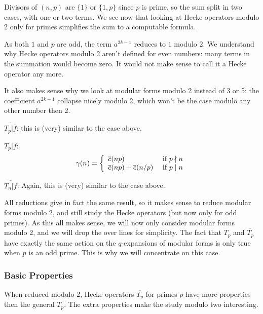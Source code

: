 Divisors of $(n,p)$ are $\{1\}$ or $\{1,p\}$ since $p$ is prime, so the sum split in two cases, with one or two terms.
We see now that looking at Hecke operators modulo 2 only for primes simplifies the sum to a computable formula.

As both $1$ and $p$ are odd, the term $a^{2k-1}$ reduces to $1$ modulo 2.
We understand why Hecke operators modulo 2 aren't defined for even numbers: many terms in the summation would become zero.
It would not make sense to call it a Hecke operator any more.

It also makes sense why we look at modular forms modulo 2 instead of 3 or 5: the coefficient $a^{2k-1}$ collapse nicely modulo 2, which won't be the case modulo any other number then 2.

$\overline{T_p|\overline{f}}$:
this is (very) similar to the case above.

$\overline{T_p}|\overline{f}$:
$$
\gamma(n)
= \left\lbrace
\begin{array}{l l}
  \overline{c}(np)                   & \text{ if } p \nmid n \\
  \overline{c}(np)+\overline{c}(n/p) & \text{ if } p \mid  n
\end{array}
\right.
$$

$\overline{\overline{T_n}|f}$:
Again, this is (very) similar to the case above.

All reductions give in fact the same result, so it makes sense to reduce modular forms modulo 2, and still study the Hecke operators (but now only for odd primes).
As this all makes sense, we will now only consider modular forms modulo 2, and we will drop the over lines for simplicity.
The fact that $T_p$ and $\overline{T_p}$ have exactly the same action on the $q$-expansions of modular forms is only true when $p$ is an odd prime.
This is why we will concentrate on this case.

\subsubsection{Basic Properties}
When reduced modulo 2, Hecke operators $\overline{T_p}$ for primes $p$ have more properties then the general $T_p$.
The extra properties make the study modulo two interesting.

